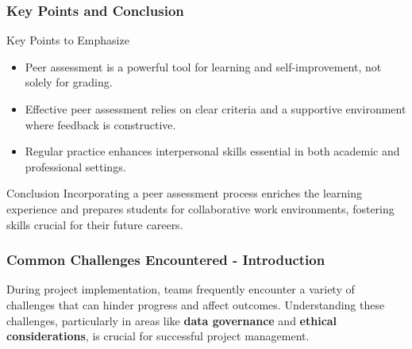\documentclass{beamer}
\begin{document}
\begin{frame}[fragile]
    \frametitle{Key Points and Conclusion}
    \begin{block}{Key Points to Emphasize}
        \begin{itemize}
            \item Peer assessment is a powerful tool for learning and self-improvement, not solely for grading.
            \item Effective peer assessment relies on clear criteria and a supportive environment where feedback is constructive.
            \item Regular practice enhances interpersonal skills essential in both academic and professional settings.
        \end{itemize}
    \end{block}

    \begin{block}{Conclusion}
        Incorporating a peer assessment process enriches the learning experience and prepares students for collaborative work environments, fostering skills crucial for their future careers.
    \end{block}
\end{frame}

\begin{frame}[fragile]
    \frametitle{Common Challenges Encountered - Introduction}
    During project implementation, teams frequently encounter a variety of challenges that can hinder progress and affect outcomes. 
    Understanding these challenges, particularly in areas like \textbf{data governance} and \textbf{ethical considerations}, is crucial for successful project management.
\end{frame}
\end{document}
